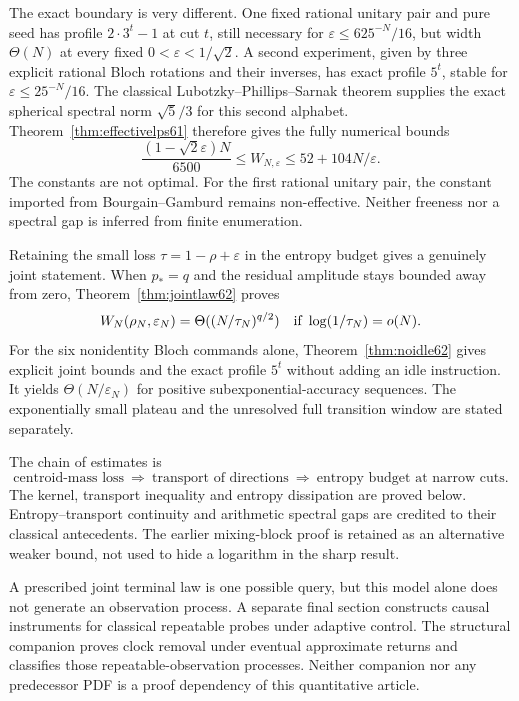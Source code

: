 The exact boundary is very different. One fixed rational unitary pair
and pure seed has profile $2\cdot3^t-1$ at cut $t$, still necessary for
$\varepsilon\le625^{-N}/16$, but width $\Theta(N)$ at every fixed
$0<\varepsilon<1/\sqrt2$. A second experiment, given by three explicit
rational Bloch rotations and their inverses, has exact profile $5^t$,
stable for $\varepsilon\le25^{-N}/16$. The classical
Lubotzky--Phillips--Sarnak theorem supplies the exact spherical spectral
norm $\sqrt5/3$ for this second alphabet. Theorem~\ref{thm:effectivelps61}
therefore gives the fully numerical bounds
\[
 \frac{(1-\sqrt2\varepsilon)N}{6500}
 \le W_{N,\varepsilon}\le52+104N/\varepsilon.
\]
The constants are not optimal. For the first rational unitary pair, the
constant imported from Bourgain--Gamburd remains non-effective. Neither
freeness nor a spectral gap is inferred from finite enumeration.

Retaining the small loss $\tau=1-\rho+\varepsilon$ in the entropy
budget gives a genuinely joint statement. When $p_*=q$ and the residual
amplitude stays bounded away from zero, Theorem~\ref{thm:jointlaw62}
proves
\[
 W_N(\rho_N,\varepsilon_N)=\Theta((N/\tau_N)^{q/2})
 \quad\hbox{if }\log(1/\tau_N)=o(N).
\]
For the six nonidentity Bloch commands alone,
Theorem~\ref{thm:noidle62} gives explicit joint bounds and the exact
profile $5^t$ without adding an idle instruction. It yields
$\Theta(N/\varepsilon_N)$ for positive subexponential-accuracy sequences.
The exponentially small plateau and the unresolved full transition
window are stated separately.

The chain of estimates is
\[
 \text{centroid-mass loss}\ \Longrightarrow\
 \text{transport of directions}\ \Longrightarrow\
 \text{entropy budget at narrow cuts}.
\]
The kernel, transport inequality and entropy dissipation are proved
below. Entropy--transport continuity and arithmetic spectral gaps are
credited to their classical antecedents. The earlier mixing-block proof
is retained as an alternative weaker bound, not used to hide a
logarithm in the sharp result.

A prescribed joint terminal law is one possible query, but this model
alone does not generate an observation process. A separate final section
constructs causal instruments for classical repeatable probes under
adaptive control. The structural companion proves clock removal under
eventual approximate returns and classifies those repeatable-observation
processes. Neither companion nor any predecessor PDF is a proof
dependency of this quantitative article.
